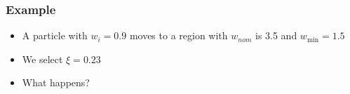 \documentclass[xcolor=x11names,compress]{beamer}
\renewcommand{\(}{\begin{columns}}
\renewcommand{\)}{\end{columns}}
\newcommand{\<}[1]{\begin{column}{#1}}
\renewcommand{\>}{\end{column}}
\begin{document}
\begin{frame}[fragile]
  \frametitle{Example}
  
  \begin{itemize}
  \item   A particle with $w_i = 0.9$ moves to a region with $w_{nom}$ is 3.5 and $w_{\min} = 1.5$
  
  \item We select $\xi = 0.23$
  
  \item What happens?
  \end{itemize}


\end{frame}


\end{document}
